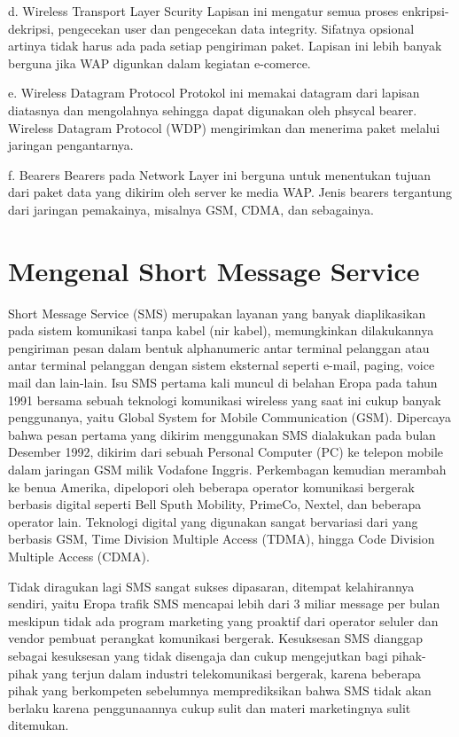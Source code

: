 \documentclass{jtetiproposalskripsi}
\begin{document}
d.	Wireless Transport Layer Scurity
Lapisan ini mengatur semua proses enkripsi-dekripsi,  pengecekan user dan pengecekan data integrity. Sifatnya opsional artinya tidak harus ada pada setiap pengiriman paket. Lapisan ini lebih banyak berguna jika WAP digunkan dalam kegiatan e-comerce.

e.	Wireless Datagram Protocol
Protokol ini memakai datagram dari lapisan diatasnya dan mengolahnya sehingga dapat digunakan oleh phsycal bearer. Wireless Datagram Protocol (WDP) mengirimkan dan menerima paket melalui jaringan pengantarnya.

f.	Bearers
Bearers pada Network Layer ini berguna untuk menentukan tujuan dari paket data yang dikirim oleh server ke media WAP. Jenis bearers tergantung dari jaringan pemakainya, misalnya  GSM, CDMA, dan sebagainya.

\section{Mengenal  Short Message Service}
Short Message Service (SMS) merupakan layanan yang banyak diaplikasikan pada sistem komunikasi tanpa kabel (nir kabel), memungkinkan dilakukannya pengiriman pesan dalam bentuk alphanumeric antar terminal pelanggan atau antar terminal pelanggan dengan sistem eksternal seperti e-mail, paging, voice mail dan lain-lain. Isu SMS pertama kali muncul di belahan Eropa pada tahun 1991 bersama sebuah teknologi komunikasi wireless yang saat ini cukup banyak penggunanya, yaitu Global System for Mobile Communication (GSM). Dipercaya bahwa pesan pertama yang dikirim menggunakan SMS dialakukan pada bulan Desember 1992, dikirim dari sebuah Personal Computer (PC) ke telepon mobile dalam jaringan GSM milik Vodafone Inggris. Perkembagan kemudian merambah ke benua Amerika, dipelopori oleh beberapa operator komunikasi bergerak berbasis digital seperti Bell Sputh Mobility, PrimeCo, Nextel, dan beberapa operator lain. Teknologi digital yang digunakan sangat bervariasi dari yang berbasis GSM, Time Division Multiple Access (TDMA), hingga Code Division Multiple Access (CDMA).


Tidak diragukan lagi SMS sangat sukses dipasaran, ditempat kelahirannya sendiri, yaitu Eropa trafik SMS mencapai lebih dari 3 miliar message per bulan meskipun tidak ada program marketing yang proaktif dari operator seluler dan vendor pembuat perangkat komunikasi bergerak. Kesuksesan SMS dianggap sebagai kesuksesan  yang tidak disengaja dan cukup mengejutkan bagi pihak-pihak yang terjun dalam industri telekomunikasi bergerak, karena beberapa pihak yang berkompeten sebelumnya memprediksikan bahwa SMS tidak akan berlaku karena penggunaannya cukup sulit dan materi marketingnya sulit ditemukan.
\end{document}
